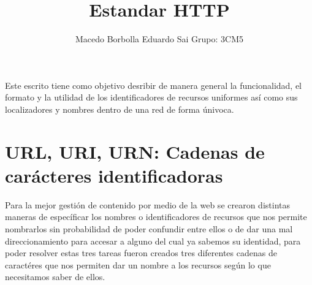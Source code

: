 \documentclass[12pt]{article}
\title{Estandar HTTP}
\author{Macedo Borbolla Eduardo Sai \inst{1}Grupo: 3CM5 }
\begin{document}
 

\maketitle

\begin{Resumen}
 Este escrito tiene como objetivo desribir de manera general la funcionalidad, el formato  y la utilidad de los identificadores de recursos uniformes así como sus localizadores
 y nombres dentro de una red de forma únivoca. 
\end{Resumen}


\section{ URL, URI, URN: Cadenas de carácteres identificadoras}

Para la mejor gestión de contenido por medio de la web se crearon distintas maneras de específicar los nombres o identificadores de recursos que nos permite nombrarlos sin
probabilidad de poder confundir entre ellos o de dar una mal direccionamiento para accesar a alguno del cual ya sabemos su identidad, para poder resolver estas tres tareas
fueron creados tres diferentes cadenas de caractéres que nos permiten dar un nombre a los recursos según lo que necesitamos saber de ellos.
\end{document}
